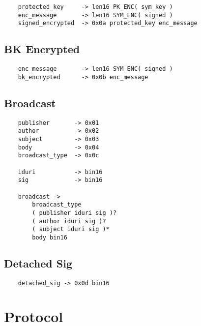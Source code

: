 \documentclass[letterpaper,11pt,oneside]{article}
\begin{document}
\vspace{10pt}
\begin{verbatim}
    protected_key     -> len16 PK_ENC( sym_key )
    enc_message       -> len16 SYM_ENC( signed )
    signed_encrypted  -> 0x0a protected_key enc_message
\end{verbatim}
\vspace{10pt}

\subsection{BK Encrypted}

\vspace{10pt}
\begin{verbatim}
    enc_message       -> len16 SYM_ENC( signed )
    bk_encrypted      -> 0x0b enc_message
\end{verbatim}
\vspace{10pt}

\subsection{Broadcast}

\vspace{10pt}
\begin{verbatim}
    publisher       -> 0x01
    author          -> 0x02
    subject         -> 0x03
    body            -> 0x04
    broadcast_type  -> 0x0c

    iduri           -> bin16
    sig             -> bin16 

    broadcast ->
        broadcast_type
        ( publisher iduri sig )?
        ( author iduri sig )?
        ( subject iduri sig )*
        body bin16 
\end{verbatim}
\vspace{10pt}

\subsection{Detached Sig}

\vspace{10pt}
\begin{verbatim}
    detached_sig -> 0x0d bin16
\end{verbatim}
\vspace{10pt}


%
%

\section{Protocol}
\end{document}
